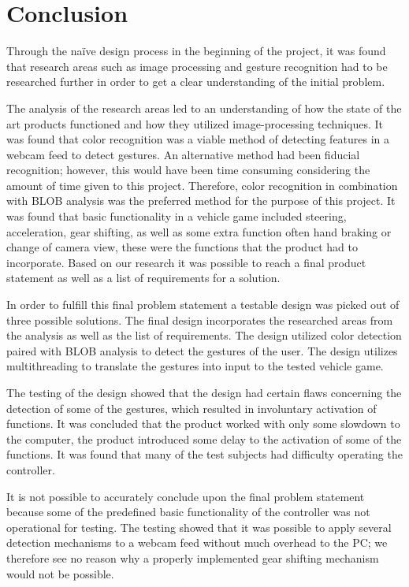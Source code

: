 \section{Conclusion}
Through the naïve design process in the beginning of the project, it was found that research areas such as image processing and gesture recognition had to be researched further in order to get a clear understanding of the initial problem.
\bigskip

The analysis of the research areas led to an understanding of how the state of the art products functioned and how they utilized image-processing techniques. 
It was found that color recognition was a viable method of detecting features in a webcam feed to detect gestures. 
An alternative method had been fiducial recognition; 
however, this would have been time consuming considering the amount of time given to this project. 
Therefore, color recognition in combination with BLOB analysis was the preferred method for the purpose of this project. 
It was found that basic functionality in a vehicle game included steering, acceleration, gear shifting, as well as some extra function often hand braking or change of camera view, these were the functions that the product had to incorporate. 
Based on our research it was possible to reach a final product statement as well as a list of requirements for a solution.
\bigskip

In order to fulfill this final problem statement a testable design was picked out of three possible solutions. 
The final design incorporates the researched areas from the analysis as well as the list of requirements. 
The design utilized color detection paired with BLOB analysis to detect the gestures of the user. 
The design utilizes multithreading to translate the gestures into input to the tested vehicle game.
\bigskip

The testing of the design showed that the design had certain flaws concerning the detection of some of the gestures, which resulted in involuntary activation of functions. 
It was concluded that the product worked with only some slowdown to the computer, the product introduced some delay to the activation of some of the functions. 
It was found that many of the test subjects had difficulty operating the controller.
\bigskip

It is not possible to accurately conclude upon the final problem statement because some of the predefined basic functionality of the controller was not operational for testing.  
The testing showed that it was possible to apply several detection mechanisms to a webcam feed without much overhead to the PC; 
we therefore see no reason why a properly implemented gear shifting mechanism would not be possible. 
